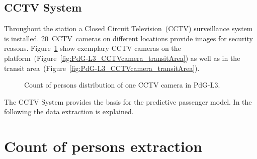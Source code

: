 \subsection{CCTV System}
\label{subsec:CCTVSystem}

Throughout the station a Closed Circuit Television~(CCTV) surveillance system is installed. 20~CCTV~cameras on different locations provide images for security reasons. Figure~\ref{fig:PdG-L3_CCTVcameras} show exemplary CCTV cameras on the platform~(Figure~\ref{fig:PdG-L3_CCTVcamera_transitArea}) as well as in the transit area~(Figure~\ref{fig:PdG-L3_CCTVcamera_transitArea}).

\begin{figure}%

  \centering

  \hfill

  \caption{Count of persons distribution of one CCTV camera in PdG-L3.}
  \label{fig:PdG-L3_CCTVcameras}

\end{figure}

The CCTV System provides the basis for the predictive passenger model. In the following the data extraction  is explained.


\section{Count of persons extraction}
\label{sec:PassengerDensityDataExtraction}


